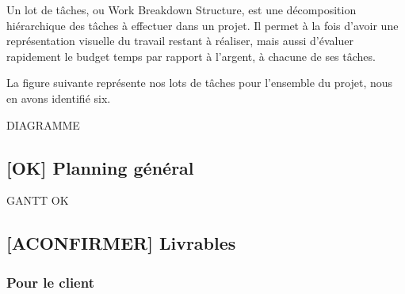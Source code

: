 \documentclass[10pt,a4paper]{article}
\begin{document}
Un lot de tâches, ou Work Breakdown Structure, est une décomposition hiérarchique des tâches à effectuer dans un projet. Il permet à la fois d'avoir une représentation visuelle du travail restant à réaliser, mais aussi d'évaluer rapidement le budget temps par rapport à l'argent, à chacune de ses tâches.

La figure suivante représente nos lots de tâches pour l'ensemble du projet, nous en avons identifié six.

DIAGRAMME

\subsection{[OK] Planning général}

GANTT OK %

\subsection{[ACONFIRMER] Livrables}

\subsubsection{Pour le client}
\end{document}
